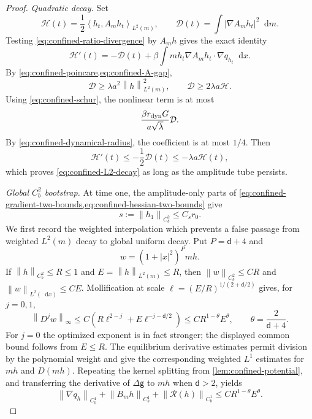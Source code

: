 \documentclass[11pt,reqno]{amsart}
\numberwithin{equation}{section}
\theoremstyle{definition}
\theoremstyle{remark}
\newcommand{\g}{\mathsf g}
\renewcommand{\d}{\mathsf d}
\newcommand{\dd}{\mathop{}\!\mathrm d}
\newcommand{\norm}[1]{\left\lVert#1\right\rVert}
\newcommand{\ip}[2]{\left\langle#1,#2\right\rangle}
\begin{document}
\begin{proof}
\emph{Quadratic decay.}
Set
\begin{equation}\label{eq:confined-quadratic-energy}
 \mathcal H(t)=\frac12\ip{h_t}{A_mh_t}_{L^2(m)},
 \qquad
 \mathcal D(t)=\int|\nabla A_mh_t|^2\dd m.
\end{equation}
Testing \eqref{eq:confined-ratio-divergence} by $A_mh$ gives the exact identity
\begin{equation}\label{eq:confined-H-identity}
 \mathcal H'(t)=-\mathcal D(t)
 +\beta\int mh_t\nabla A_mh_t\cdot\nabla q_{h_t}\dd x.
\end{equation}
By \cref{eq:confined-poincare,eq:confined-A-gap},
\begin{equation}\label{eq:confined-D-controls}
 \mathcal D\geq\lambda a^2\norm h_{L^2(m)}^2,
 \qquad \mathcal D\geq2\lambda a\mathcal H.
\end{equation}
Using \eqref{eq:confined-schur}, the nonlinear term is at most
\begin{equation}\label{eq:confined-H-cross}
 \frac{\beta r_{\rm dyn}G}{a\sqrt\lambda}\mathcal D.
\end{equation}
By \eqref{eq:confined-dynamical-radius}, the coefficient is at most $1/4$. Then
\begin{equation}\label{eq:confined-H-decay}
 \mathcal H'(t)\leq-\frac12\mathcal D(t)
 \leq-\lambda a\mathcal H(t),
\end{equation}
which proves \eqref{eq:confined-L2-decay} as long as the amplitude tube persists.

\emph{Global $C_b^2$ bootstrap.}
At time one, the amplitude-only parts of \cref{eq:confined-gradient-two-bounds,eq:confined-hessian-two-bounds} give
\begin{equation}\label{eq:confined-time-one-C2}
 s:=\norm{h_1}_{C_b^2}\leq C_s r_0.
\end{equation}
We first record the weighted interpolation which prevents a false passage from weighted $L^2(m)$ decay to global uniform decay. Put $P=\d+4$ and
\begin{equation}\label{eq:confined-localized-density}
 w=(1+|x|^2)^Pmh.
\end{equation}
If $\norm h_{C_b^2}\leq R\leq1$ and $E=\norm h_{L^2(m)}\leq R$, then $\norm w_{C_b^2}\leq CR$ and $\norm w_{L^2(\dd x)}\leq CE$. Mollification at scale
$\ell=(E/R)^{1/(2+\d/2)}$ gives, for $j=0,1$,
\begin{equation}\label{eq:confined-weighted-interpolation}
 \norm{D^jw}_\infty\leq
 C\left(R\ell^{2-j}+E\ell^{-j-\d/2}\right)
 \leq CR^{1-\theta}E^\theta,
 \qquad \theta=\frac2{\d+4}.
\end{equation}
For $j=0$ the optimized exponent is in fact stronger; the displayed common bound follows from $E\leq R$. The equilibrium derivative estimates permit division by the polynomial weight and give the corresponding weighted $L^1$ estimates for $mh$ and $D(mh)$. Repeating the kernel splitting from \cref{lem:confined-potential}, and transferring the derivative of $\Delta\g$ to $mh$ when $\d>2$, yields
\begin{equation}\label{eq:confined-localized-potential}
 \norm{\nabla q_h}_{C_b^1}+\norm{B_mh}_{C_b^1}
 +\norm{\mathcal R(h)}_{C_b^1}
 \leq CR^{1-\theta}E^\theta.
\end{equation}


\end{proof}
\end{document}

